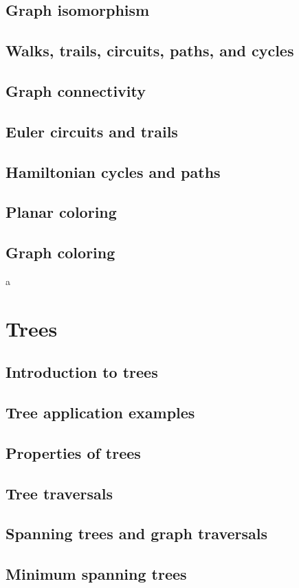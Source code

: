 \documentclass{article}
\begin{document}
\subsection{Graph isomorphism}
\subsection{Walks, trails, circuits, paths, and cycles}
\subsection{Graph connectivity}
\subsection{Euler circuits and trails}
\subsection{Hamiltonian cycles and paths}
\subsection{Planar coloring}
\subsection{Graph coloring}

a

\section{Trees}
\subsection{Introduction to trees}
\subsection{Tree application examples}
\subsection{Properties of trees}
\subsection{Tree traversals}
\subsection{Spanning trees and graph traversals}
\subsection{Minimum spanning trees}
\end{document}
